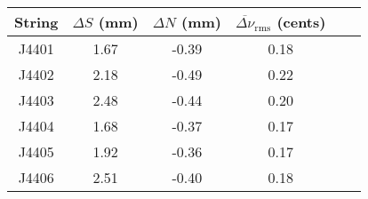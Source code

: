 \begin{tabular}{cccccc}
\toprule
String & $\Delta S$ (mm) & $\Delta N$ (mm) & $\overline{\Delta \nu}_\text{rms}$ (cents) \\
\midrule
J4401 & 1.67 & -0.39 & 0.18 \\
J4402 & 2.18 & -0.49 & 0.22 \\
J4403 & 2.48 & -0.44 & 0.20 \\
J4404 & 1.68 & -0.37 & 0.17 \\
J4405 & 1.92 & -0.36 & 0.17 \\
J4406 & 2.51 & -0.40 & 0.18 \\
\bottomrule
\end{tabular}

